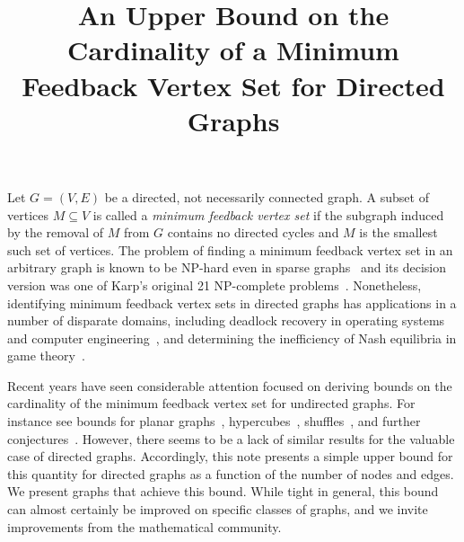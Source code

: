 \documentclass[CRMATH,Unicode,manuscript]{cedram}
\title{An Upper Bound on the Cardinality of a Minimum Feedback Vertex Set for Directed Graphs}
\author{\firstname{Philip} \middlename{N.} \lastname{Brown}\CDRorcid{0000-0003-3953-0503}}
\begin{document}
\maketitle





Let $G=(V,E)$ be a directed, not necessarily connected graph.
A subset of vertices $M\subseteq V$ is called a \emph{minimum feedback vertex set} if the subgraph induced by the removal of $M$ from $G$ contains no directed cycles and $M$ is the smallest such set of vertices.
The problem of finding a minimum feedback vertex set in an arbitrary graph is known to be NP-hard even in sparse graphs~\cite{Fomin2006,Borradaile2019} and its decision version was one of Karp's original 21 NP-complete problems~\cite{Karp1972}.
Nonetheless, identifying minimum feedback vertex sets in directed graphs has applications in a number of disparate domains, including deadlock recovery in operating systems and computer engineering~\cite{Lin2000}, and determining the inefficiency of Nash equilibria in game theory~\cite{Brown2019c}.


Recent years have seen considerable attention focused on deriving bounds on the cardinality of the minimum feedback vertex set for undirected graphs. For instance see bounds for planar graphs~\cite{Kelly2017}, hypercubes~\cite{Madelaine2008}, shuffles~\cite{Kralovic2003}, and further conjectures~\cite{Kowalik2010}.
However, there seems to be a lack of similar results for the valuable case of directed graphs.
Accordingly, this note presents a simple upper bound for this quantity for directed graphs as a function of the number of nodes and edges.
We present graphs that achieve this bound.
While tight in general, this bound can almost certainly be improved on specific classes of graphs, and we invite improvements from the mathematical community.
\end{document}
